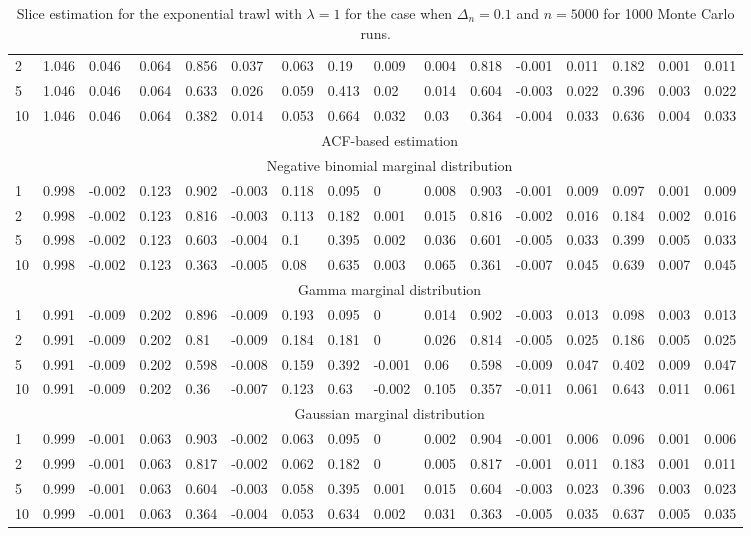 \documentclass{article}
\theoremstyle{plain}
\theoremstyle{definition}
\theoremstyle{remark}
\begin{document}
\begin{appendix}
{\begin{table}[ht]
\begin{tabular}{l|lll|lll|lll|lll|lll}
  2 & 1.046 & 0.046 & 0.064 & 0.856 & 0.037 & 0.063 & 0.19 & 0.009 & 0.004 & 0.818 & -0.001 & 0.011 & 0.182 & 0.001 & 0.011 \\ 
  5 & 1.046 & 0.046 & 0.064 & 0.633 & 0.026 & 0.059 & 0.413 & 0.02 & 0.014 & 0.604 & -0.003 & 0.022 & 0.396 & 0.003 & 0.022 \\ 
  10 & 1.046 & 0.046 & 0.064 & 0.382 & 0.014 & 0.053 & 0.664 & 0.032 & 0.03 & 0.364 & -0.004 & 0.033 & 0.636 & 0.004 & 0.033 \\ 
    \midrule	
   &\multicolumn{15}{c}{ACF-based estimation}\\ \midrule
&\multicolumn{15}{c}{Negative binomial marginal distribution}\\
1 & 0.998 & -0.002 & 0.123 & 0.902 & -0.003 & 0.118 & 0.095 & 0 & 0.008 & 0.903 & -0.001 & 0.009 & 0.097 & 0.001 & 0.009 \\ 
  2 & 0.998 & -0.002 & 0.123 & 0.816 & -0.003 & 0.113 & 0.182 & 0.001 & 0.015 & 0.816 & -0.002 & 0.016 & 0.184 & 0.002 & 0.016 \\ 
  5 & 0.998 & -0.002 & 0.123 & 0.603 & -0.004 & 0.1 & 0.395 & 0.002 & 0.036 & 0.601 & -0.005 & 0.033 & 0.399 & 0.005 & 0.033 \\ 
  10 & 0.998 & -0.002 & 0.123 & 0.363 & -0.005 & 0.08 & 0.635 & 0.003 & 0.065 & 0.361 & -0.007 & 0.045 & 0.639 & 0.007 & 0.045 \\ 
  \midrule
  &\multicolumn{15}{c}{Gamma marginal distribution}\\
 1 & 0.991 & -0.009 & 0.202 & 0.896 & -0.009 & 0.193 & 0.095 & 0 & 0.014 & 0.902 & -0.003 & 0.013 & 0.098 & 0.003 & 0.013 \\ 
  2 & 0.991 & -0.009 & 0.202 & 0.81 & -0.009 & 0.184 & 0.181 & 0 & 0.026 & 0.814 & -0.005 & 0.025 & 0.186 & 0.005 & 0.025 \\ 
  5 & 0.991 & -0.009 & 0.202 & 0.598 & -0.008 & 0.159 & 0.392 & -0.001 & 0.06 & 0.598 & -0.009 & 0.047 & 0.402 & 0.009 & 0.047 \\ 
  10 & 0.991 & -0.009 & 0.202 & 0.36 & -0.007 & 0.123 & 0.63 & -0.002 & 0.105 & 0.357 & -0.011 & 0.061 & 0.643 & 0.011 & 0.061 \\ 
    \midrule
   &\multicolumn{15}{c}{Gaussian marginal distribution}\\
   1 & 0.999 & -0.001 & 0.063 & 0.903 & -0.002 & 0.063 & 0.095 & 0 & 0.002 & 0.904 & -0.001 & 0.006 & 0.096 & 0.001 & 0.006 \\ 
  2 & 0.999 & -0.001 & 0.063 & 0.817 & -0.002 & 0.062 & 0.182 & 0 & 0.005 & 0.817 & -0.001 & 0.011 & 0.183 & 0.001 & 0.011 \\ 
  5 & 0.999 & -0.001 & 0.063 & 0.604 & -0.003 & 0.058 & 0.395 & 0.001 & 0.015 & 0.604 & -0.003 & 0.023 & 0.396 & 0.003 & 0.023 \\ 
  10 & 0.999 & -0.001 & 0.063 & 0.364 & -0.004 & 0.053 & 0.634 & 0.002 & 0.031 & 0.363 & -0.005 & 0.035 & 0.637 & 0.005 & 0.035 \\    
     \bottomrule
\end{tabular}
\caption{\label{tab:slices-exp} Slice estimation for the  exponential trawl with $\lambda =1$ for the case when $\Delta_n=0.1$ and $n=5000$ for 1000 Monte Carlo runs.}
\end{table}
}



\end{appendix}
\end{document}

